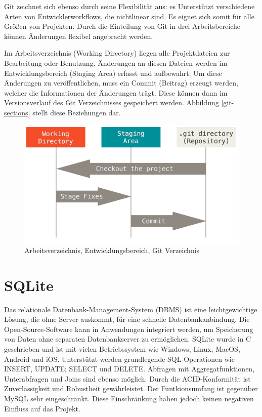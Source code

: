 Git zeichnet sich ebenso durch seine Flexibilität aus: es Unterstützt verschiedene Arten von Entwicklerworkflows, die nichtlinear sind. Es eignet sich somit für alle Größen von Projekten.\cite{git}
Durch die Einteilung von Git in drei Arbeitsbereiche können Änderungen flexibel angebracht werden.

Im Arbeitsverzeichnis (Working Directory) liegen alle Projektdateien zur Bearbeitung oder Benutzung.
Änderungen an diesen Dateien werden im Entwicklungsbereich (Staging Area) erfasst und aufbewahrt.
Um diese Änderungen zu veröffentlichen, muss ein Commit (Beitrag) erzeugt werden, welcher die Informationen der Änderungen trägt.
Diese können dann im Versionsverlauf des Git Verzeichnisses gespeichert werden. Abbildung \vref{git-sections} stellt diese Beziehungen dar.

\begin{figure}[ht]
	\centering
	\includegraphics[width=0.8\linewidth]{git-sections.png}
	\caption{Arbeitsverzeichnis, Entwicklungsbereich, Git Verzeichnis}
	\label{git-sections}
\end{figure}

\section{SQLite}
Das relationale Datenbank-Management-System (DBMS) ist eine leichtgewichtige Lösung, die ohne Server auskommt, für eine schnelle Datenbankanbindung. Die Open-Source-Software kann in Anwendungen integriert werden, um Speicherung von Daten ohne separaten Datenbankserver zu ermöglichen. SQLite wurde in C geschrieben und ist mit vielen Betriebssystem wie Windows, Linux, MacOS, Android und iOS. Unterstützt werden grundlegende SQL-Operationen wie INSERT, UPDATE; SELECT und DELETE. Abfragen mit Aggregatfunktionen, Unterabfragen und Joins sind ebenso möglich. Durch die ACID-Konformität ist Zuverlässigkeit und Robustheit gewährleistet. Der Funtkionsumfang ist gegenüber MySQL sehr eingeschränkt. Diese Einschränkung haben jedoch keinen negativen Einfluss auf das Projekt.

